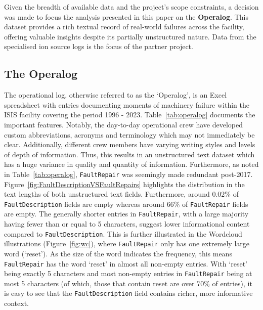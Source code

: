 \documentclass[10pt,oneside]{report}
\begin{document}
Given the breadth of available data and the project's scope constraints, a decision was made to focus the analysis presented in this paper on the \textbf{Operalog}. This dataset provides a rich textual record of real-world failures across the facility, offering valuable insights despite its partially unstructured nature. Data from the specialised ion source logs is the focus of the partner project. 

\subsection{The Operalog}
The operational log, otherwise referred to as the `Operalog', is an Excel spreadsheet with entries documenting moments of machinery failure within the ISIS facility covering the period 1996 - 2023. Table~\ref{tab:operalog} documents the important features. Notably, the day-to-day operational crew have developed custom abbreviations, acronyms and terminology which may not immediately be clear. Additionally, different crew members have varying writing styles and levels of depth of information. Thus, this results in an unstructured text dataset which has a huge variance in quality and quantity of information. Furthermore, as noted in Table~\ref{tab:operalog}, \texttt{FaultRepair} was seemingly made redundant post-2017. Figure~\ref{fig:FaultDescriptionVSFaultRepairs} highlights the distribution in the text lengths of both unstructured text fields. Furthermore, around $0.02\%$ of \texttt{FaultDescription} fields are empty whereas around $66\%$ of \texttt{FaultRepair} fields are empty. The generally shorter entries in \texttt{FaultRepair}, with a large majority having fewer than or equal to 5 characters, suggest lower informational content compared to \texttt{FaultDescription}. This is further illustrated in the Wordcloud illustrations \cite{oesper2011wordcloud} (Figure~\ref{fig:wc}), where \texttt{FaultRepair} only has one extremely large word (`reset'). As the size of the word indicates the frequency, this means \texttt{FaultRepair} has the word `reset' in almost all non-empty entries. With `reset' being exactly 5 characters and most non-empty entries in \texttt{FaultRepair} being at most 5 characters (of which, those that contain reset are over 70\% of entries), it is easy to see that the \texttt{FaultDescription} field contains richer, more informative context. 
\end{document}
